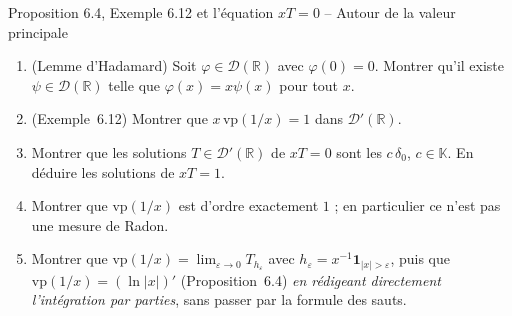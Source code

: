 \documentclass[11pt,a4paper]{article}
\newcommand{\R}{\mathbb{R}}
\newcommand{\K}{\mathbb{K}}
\newcommand{\D}{\mathcal{D}}
\theoremstyle{definition}
\begin{document}
\begin{exo}{Proposition 6.4, Exemple 6.12 et l'équation $xT=0$ -- Autour de la valeur principale}
\begin{enumerate}[label=(\alph*)]
  \item (Lemme d'Hadamard) Soit $\varphi\in\D(\R)$ avec $\varphi(0)=0$. Montrer qu'il existe $\psi\in\D(\R)$ telle que $\varphi(x)=x\psi(x)$ pour tout $x$.
  \item (Exemple~6.12) Montrer que $x\,\mathrm{vp}(1/x)=1$ dans $\D'(\R)$.
  \item Montrer que les solutions $T\in\D'(\R)$ de $xT=0$ sont les $c\,\delta_0$, $c\in\K$. En déduire les solutions de $xT=1$.
  \item Montrer que $\mathrm{vp}(1/x)$ est d'ordre exactement $1$ ; en particulier ce n'est pas une mesure de Radon.
  \item Montrer que $\mathrm{vp}(1/x)=\lim_{\varepsilon\to0}T_{h_\varepsilon}$ avec $h_\varepsilon=x^{-1}\mathbf 1_{|x|>\varepsilon}$, puis que $\mathrm{vp}(1/x)=(\ln|x|)'$ (Proposition~6.4) \emph{en rédigeant directement l'intégration par parties}, sans passer par la formule des sauts.
\end{enumerate}
\end{exo}
\end{document}
